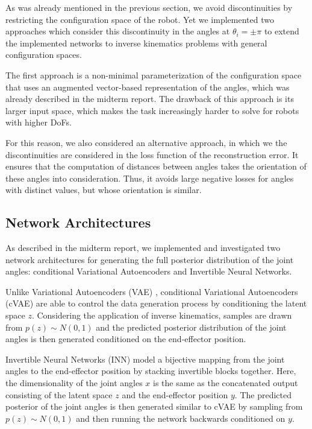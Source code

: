 \documentclass[conference]{IEEEtran}
\begin{document}
As was already mentioned in the previous section, we avoid discontinuities by restricting the configuration space of the robot. Yet we implemented two approaches which consider this discontinuity in the angles at $\theta_i = \pm \pi$ to extend the implemented networks to inverse kinematics problems with general configuration spaces.

The first approach is a non-minimal parameterization of the configuration space that uses an augmented vector-based representation of the angles, which was already described in the midterm report. The drawback of this approach is its larger input space, which makes the task increasingly harder to solve for robots with higher DoFs.

For this reason, we also considered an alternative approach, in which we the discontinuities are considered in the loss function of the reconstruction error. It ensures that the computation of distances between angles takes the orientation of these angles into consideration. Thus, it avoids large negative losses for angles with distinct values, but whose orientation is similar.

\subsection*{Network Architectures}

As described in the midterm report, we implemented and investigated two network architectures for generating the full posterior distribution of the joint angles: conditional Variational Autoencoders and Invertible Neural Networks. 

Unlike Variational Autoencoders (VAE) \cite{Kingma2014}, conditional Variational Autoencoders (cVAE) \cite{Sohn2015} are able to control the data generation process by conditioning the latent space $z$. Considering the application of inverse kinematics, samples are drawn from $p(z) \sim N(0, 1)$ and the predicted posterior distribution of the joint angles is then generated conditioned on the end-effector position.

Invertible Neural Networks (INN) \cite{Ardizzone2018} model a bijective mapping from the joint angles to the end-effector position by stacking invertible blocks together. Here, the dimensionality of the joint angles $x$ is the same as the concatenated output consisting of the latent space $z$ and the end-effector position $y$. The predicted posterior of the joint angles is then generated similar to cVAE by sampling from $p(z) \sim N(0, 1)$ and then running the network backwards conditioned on $y$.
\end{document}
